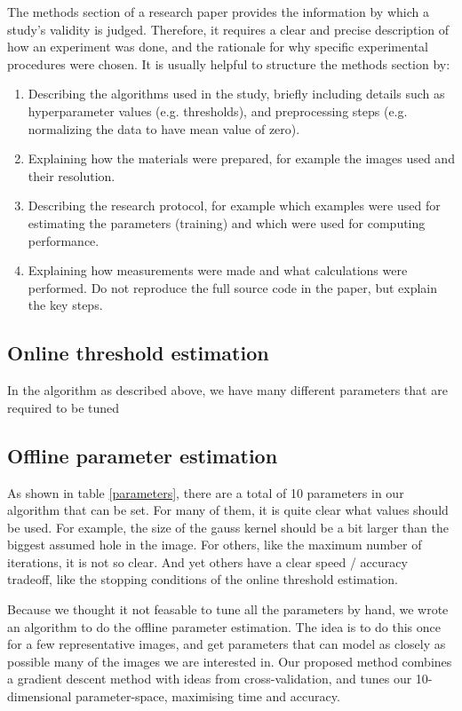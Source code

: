 \documentclass[10pt,conference,compsocconf]{IEEEtran}
\begin{document}
The methods section of a research paper provides the information by
which a study's validity is judged.
Therefore, it requires a clear and precise description of how an
experiment was done, and the rationale
for why specific experimental procedures were chosen.
It is usually helpful to
structure the methods section by:
\begin{enumerate}
\item Describing the algorithms used in the study, briefly including
  details such as hyperparameter values (e.g. thresholds), and
  preprocessing steps (e.g. normalizing the data to have mean value of
  zero).
\item Explaining how the materials were prepared, for example the
  images used and their resolution.
\item Describing the research protocol, for example which examples
  were used for estimating the parameters (training) and which were
  used for computing performance.
\item Explaining how measurements were made and what
  calculations were performed. Do not reproduce the full source code in
  the paper, but explain the key steps.
\end{enumerate}

\subsection{Online threshold estimation}
In the algorithm as described above, we have many different parameters that are required to be tuned

\subsection{Offline parameter estimation}
As shown in table \ref{parameters}, there are a total of 10 parameters in our algorithm that can be set.
For many of them, it is quite clear what values should be used. For example, the size of the gauss kernel
should be a bit larger than the biggest assumed hole in the image. For others, like the maximum number of
iterations, it is not so clear. And yet others have a clear speed / accuracy tradeoff, like the stopping
conditions of the online threshold estimation.

Because we thought it not feasable to tune all the parameters by hand, we wrote an algorithm to
do the offline parameter estimation. The idea is to do this once for a few representative images, and get
parameters that can model as closely as possible many of the images we are interested in.
Our proposed method combines a gradient descent method with ideas from cross-validation, and tunes our
10-dimensional parameter-space, maximising time and accuracy.
\end{document}
